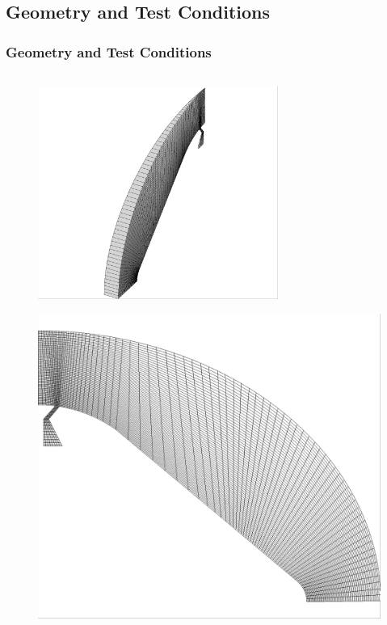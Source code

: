 \documentclass{beamer}
\begin{document}
\subsection{Geometry and Test Conditions}
\begin{frame}
  \frametitle{Geometry and Test Conditions}
  \begin{columns}
    \begin{column}{0.4\textwidth}
      \vspace{-0.5cm}
    \begin{figure}
      \centering
      \includegraphics[width=0.7\textwidth]{figures/iso-coarse.png}
    \end{figure}
    \vspace{-0.75cm}
    \begin{figure}
      \centering
        \includegraphics[width=\textwidth]{figures/side-coarse.png}

\end{figure}
\end{column}
\end{columns}
\end{frame}
\end{document}
